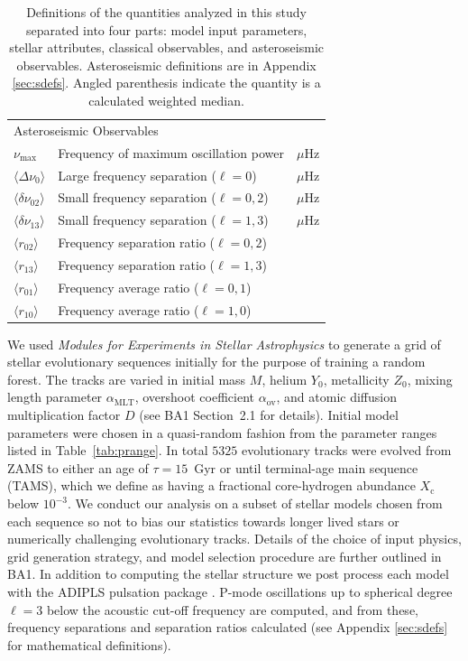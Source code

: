 \begin{table}
{\begin{tabular}{lll}
\multicolumn{3}{l}{Asteroseismic Observables} \\
$\nu_{\max}$ & Frequency of maximum oscillation power & $\mu$Hz \\
$\langle\Delta\nu_0\rangle$ & Large frequency separation ($\ell=0$) & $\mu$Hz \\
$\langle\delta\nu_{02}\rangle$ & Small frequency separation ($\ell=0,2$) & $\mu$Hz \\
$\langle\delta\nu_{13}\rangle$ & Small frequency separation ($\ell=1,3$) & $\mu$Hz \\
$\langle r_{02}\rangle$ & Frequency separation ratio ($\ell=0,2$) &  \\
$\langle r_{13}\rangle$ & Frequency separation ratio ($\ell=1,3$) &  \\
$\langle r_{01}\rangle$ & Frequency average ratio ($\ell=0,1$) & \\
$\langle r_{10}\rangle$ & Frequency average ratio ($\ell=1,0$) & \\[8pt]\hline 
\end{tabular}
}
\caption{Definitions of the quantities analyzed in this study separated into four parts: model input parameters, stellar attributes, classical observables, and asteroseismic observables. 
Asteroseismic definitions are in Appendix \ref{sec:sdefs}. 
Angled parenthesis indicate the quantity is a calculated weighted median.} 
\label{tab:parmdefs} 
\end{table} 



We used  \emph{Modules for Experiments in Stellar Astrophysics} \citep[MESA,][]{2011apjs..192....3p} to generate a grid of stellar evolutionary sequences initially for the purpose of training a random forest. The tracks are varied in initial mass $M$, helium $Y_0$, metallicity $Z_0$, mixing length parameter $\alpha_{\text{MLT}}$, overshoot coefficient $\alpha_{\text{ov}}$, and atomic diffusion multiplication factor $D$ (see BA1 Section~2.1 for details).
Initial model parameters were chosen in a quasi-random fashion from the parameter ranges listed in Table~\ref{tab:prange}.
In total $5325$ evolutionary tracks were evolved from ZAMS to either an age of ${\tau=15}$~Gyr or until terminal-age main sequence (TAMS), which we define as having a fractional core-hydrogen abundance $X_{\text{c}}$ below $10^{-3}$. We conduct our analysis on a subset of stellar models chosen from each sequence so not to bias our statistics towards longer lived stars or numerically challenging evolutionary tracks. 
Details of the choice of input physics, grid generation strategy, and model selection procedure are further outlined in BA1. 
In addition to computing the stellar structure we post process  each model with  the ADIPLS pulsation package \citep{2008Ap&SS.316..113C}.  P-mode oscillations up to spherical degree ${\ell=3}$ below the acoustic cut-off frequency are computed, and from these, frequency separations and separation ratios calculated (see Appendix \ref{sec:sdefs} for mathematical definitions). 


